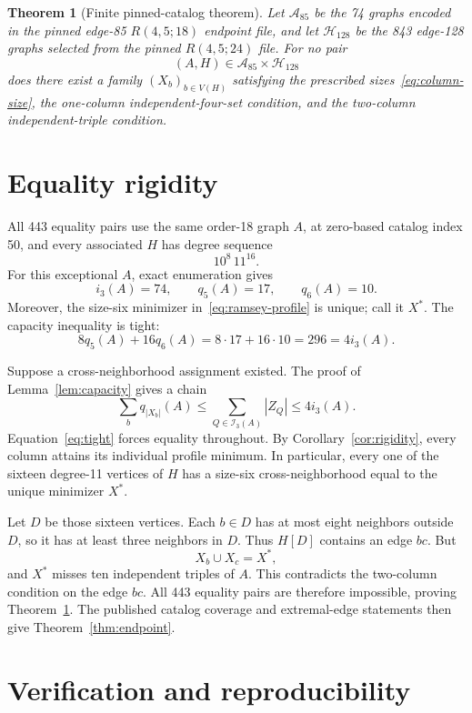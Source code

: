 \documentclass[11pt]{article}
\newtheorem{theorem}{Theorem}
\newcommand{\I}{\mathcal I}
\begin{document}
\begin{theorem}[Finite pinned-catalog theorem]\label{thm:finite}
Let $\mathcal A_{85}$ be the 74 graphs encoded in the pinned edge-85
$R(4,5;18)$ endpoint file, and let $\mathcal H_{128}$ be the 843 edge-128
graphs selected from the pinned $R(4,5;24)$ file.  For no pair
\[
 (A,H)\in\mathcal A_{85}\times\mathcal H_{128}
\]
does there exist a family $(X_b)_{b\in V(H)}$ satisfying
the prescribed sizes~\eqref{eq:column-size}, the one-column
independent-four-set condition, and the two-column independent-triple
condition.
\end{theorem}

\section{Equality rigidity}

All 443 equality pairs use the same order-18 graph $A$, at zero-based catalog
index 50, and every associated $H$ has degree sequence
\[
 10^8\,11^{16}.
\]
For this exceptional $A$, exact enumeration gives
\[
 i_3(A)=74,\qquad q_5(A)=17,\qquad q_6(A)=10.
\]
Moreover, the size-six minimizer in~\eqref{eq:ramsey-profile} is unique; call
it $X^\ast$.  The capacity inequality is tight:
\begin{equation}\label{eq:tight}
 8q_5(A)+16q_6(A)
 =8\cdot17+16\cdot10
 =296
 =4i_3(A).
\end{equation}

Suppose a cross-neighborhood assignment existed.  The proof of
Lemma~\ref{lem:capacity} gives a chain
\[
 \sum_bq_{|X_b|}(A)
 \leq\sum_{Q\in\I_3(A)}|Z_Q|
 \leq4i_3(A).
\]
Equation~\eqref{eq:tight} forces equality throughout.  By
Corollary~\ref{cor:rigidity}, every column attains its individual profile
minimum.  In particular, every one of the sixteen degree-11 vertices of $H$
has a size-six cross-neighborhood equal to the unique minimizer $X^\ast$.

Let $D$ be those sixteen vertices.  Each $b\in D$ has at most eight neighbors
outside $D$, so it has at least three neighbors in $D$.  Thus $H[D]$ contains
an edge $bc$.  But
\[
 X_b\cup X_c=X^\ast,
\]
and $X^\ast$ misses ten independent triples of $A$.  This contradicts the
two-column condition on the edge $bc$.  All 443 equality pairs are therefore
impossible, proving Theorem~\ref{thm:finite}.  The published catalog
coverage and extremal-edge statements then give Theorem~\ref{thm:endpoint}.

\section{Verification and reproducibility}
\end{document}
